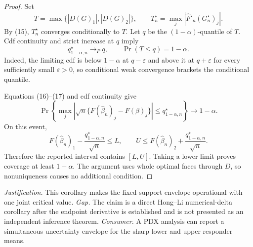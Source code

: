 \documentclass{article}
\begin{document}
\begin{proof}
Set
\[
T=\max\{|D(G)_1|,|D(G)_2|\},
\qquad
T_n^\star=\max_j|\widehat F'_n(G_n^\star)_j|.
\]
By (15), \(T_n^\star\) converges conditionally to \(T\).  Let \(q\) be the \((1-\alpha)\)-quantile of \(T\).  Cdf continuity and strict increase at \(q\) imply
\[
q_{1-\alpha,n}^\star\longrightarrow_Pq,
\qquad
\Pr(T\leq q)=1-\alpha.
\tag{17}
\]
Indeed, the limiting cdf is below \(1-\alpha\) at \(q-\varepsilon\) and above it at \(q+\varepsilon\) for every sufficiently small \(\varepsilon>0\), so conditional weak convergence brackets the conditional quantile.

Equations (16)--(17) and cdf continuity give
\[
\Pr\!\left\{
\max_j\left|\sqrt n\{F(\widehat\beta_n)_j-F(\beta)_j\}\right|
\leq q_{1-\alpha,n}^\star\right\}\longrightarrow1-\alpha.
\tag{18}
\]
On this event,
\[
F(\widehat\beta_n)_1-\frac{q_{1-\alpha,n}^\star}{\sqrt n}\leq L,
\qquad
U\leq F(\widehat\beta_n)_2+\frac{q_{1-\alpha,n}^\star}{\sqrt n}.
\]
Therefore the reported interval contains \([L,U]\).  Taking a lower limit proves coverage at least \(1-\alpha\).  The argument uses whole optimal faces through \(D\), so nonuniqueness causes no additional condition.
\end{proof}
\par\smallskip\noindent \textit{Justification.} This corollary makes the fixed-support envelope operational with one joint critical value. \textit{Gap.} The claim is a direct Hong--Li numerical-delta corollary after the endpoint derivative is established and is not presented as an independent inference theorem. \textit{Consumer.} A PDX analysis can report a simultaneous uncertainty envelope for the sharp lower and upper responder means.
\end{document}
